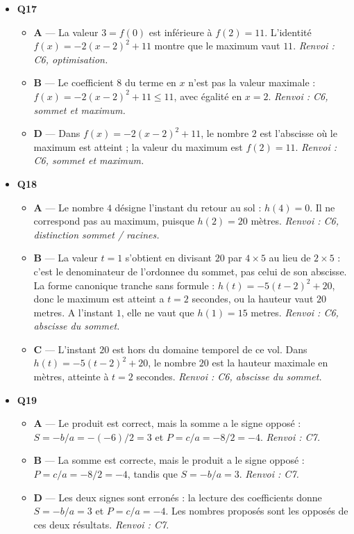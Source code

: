 \begin{itemize}
\begin{itemize}
  \end{itemize}
  \item \textbf{Q17}
  \begin{itemize}
    \item \textbf{A} — La valeur $3=f(0)$ est inférieure à $f(2)=11$. L’identité $f(x)=-2(x-2)^2+11$ montre que le maximum vaut $11$. \emph{Renvoi : C6, optimisation.}
    \item \textbf{B} — Le coefficient $8$ du terme en $x$ n’est pas la valeur maximale : $f(x)=-2(x-2)^2+11\leq11$, avec égalité en $x=2$. \emph{Renvoi : C6, sommet et maximum.}
    \item \textbf{D} — Dans $f(x)=-2(x-2)^2+11$, le nombre $2$ est l’abscisse où le maximum est atteint ; la valeur du maximum est $f(2)=11$. \emph{Renvoi : C6, sommet et maximum.}
  \end{itemize}
  \item \textbf{Q18}
  \begin{itemize}
    \item \textbf{A} — Le nombre $4$ désigne l’instant du retour au sol : $h(4)=0$. Il ne correspond pas au maximum, puisque $h(2)=20$ mètres. \emph{Renvoi : C6, distinction sommet / racines.}
    \item \textbf{B} — La valeur $t=1$ s'obtient en divisant $20$ par $4 \times 5$ au lieu de $2 \times 5$ : c'est le denominateur de l'ordonnee du sommet, pas celui de son abscisse. La forme canonique tranche sans formule : $h(t) = -5(t-2)^2 + 20$, donc le maximum est atteint a $t=2$ secondes, ou la hauteur vaut $20$ metres. A l'instant $1$, elle ne vaut que $h(1)=15$ metres. \emph{Renvoi : C6, abscisse du sommet.}
    \item \textbf{C} — L’instant $20$ est hors du domaine temporel de ce vol. Dans $h(t)=-5(t-2)^2+20$, le nombre $20$ est la hauteur maximale en mètres, atteinte à $t=2$ secondes. \emph{Renvoi : C6, abscisse du sommet.}
  \end{itemize}
  \item \textbf{Q19}
  \begin{itemize}
    \item \textbf{A} — Le produit est correct, mais la somme a le signe opposé : $S=-b/a=-(-6)/2=3$ et $P=c/a=-8/2=-4$. \emph{Renvoi : C7.}
    \item \textbf{B} — La somme est correcte, mais le produit a le signe opposé : $P=c/a=-8/2=-4$, tandis que $S=-b/a=3$. \emph{Renvoi : C7.}
    \item \textbf{D} — Les deux signes sont erronés : la lecture des coefficients donne $S=-b/a=3$ et $P=c/a=-4$. Les nombres proposés sont les opposés de ces deux résultats. \emph{Renvoi : C7.}

\end{itemize}
\end{itemize}
